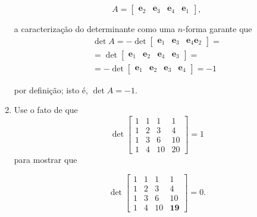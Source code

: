 \documentclass[leqno]{article}
\begin{document}
\begin{enumerate}
\begin{sol}
	\begin{equation*} 
		A = 
		\begin{bmatrix} 
			\mathbf{e}_{2} & \mathbf{e}_{3} & \mathbf{e}_{4} & \mathbf{e}_{1}    
		\end{bmatrix}, 
	\end{equation*} 

	\noindent a caracterização do determinante como uma $n$-forma garante que 
	\begin{equation*} 
		\begin{split} 
			\det A = 
			-\det 
			\begin{bmatrix} 
				\mathbf{e}_{1} & \mathbf{e}_{3} & \mathbf{e}_{4} \mathbf{e}_{2}    
			\end{bmatrix} = \\ 
			= \det 
			\begin{bmatrix} 
				\mathbf{e}_{1} & \mathbf{e}_{2} & \mathbf{e}_{4} & \mathbf{e}_{3}    
			\end{bmatrix} = \\ 
			= -\det 
			\begin{bmatrix} 
				\mathbf{e}_{1} & \mathbf{e}_{2} & \mathbf{e}_{3} & \mathbf{e}_{4}    
			\end{bmatrix} = -1 
		\end{split}    
	\end{equation*} 

	\noindent por definição; isto é, $\det A = -1$. 

\end{sol}


\item Use o fato de que
$$\det \begin{bmatrix} 1 & 1 & 1 & 1 \\ 1 & 2 & 3 & 4 \\ 1 & 3 & 6 & 10 \\ 1 & 4 & 10 & 20  \end{bmatrix} = 1$$
para mostrar que

$$\det \begin{bmatrix} 1 & 1 & 1 & 1 \\ 1 & 2 & 3 & 4 \\ 1 & 3 & 6 & 10 \\ 1 & 4 & 10 & \mathbf{19}  \end{bmatrix} = 0.$$


\end{enumerate}
\end{document}
